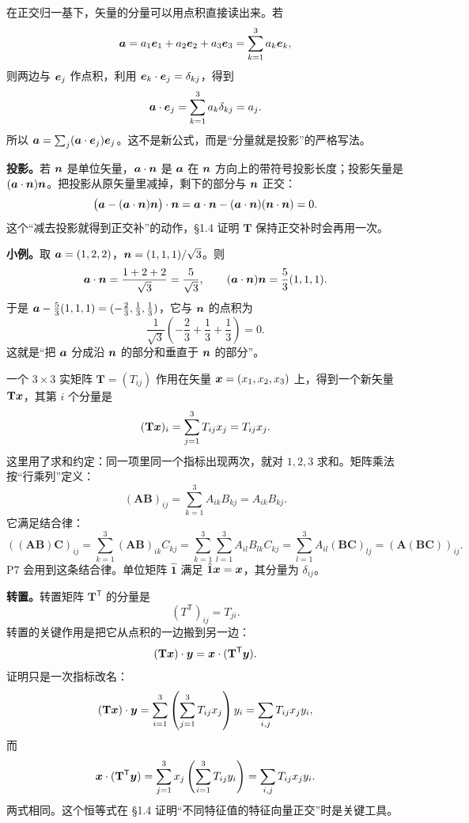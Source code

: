 \documentclass[11pt]{ctexart}
\newcommand{\ten}[1]{\mathbf{#1}}
\newcommand{\unitd}{\hat{\ten{1}}}
\let\origsubhdr\subhdr
\renewcommand{\subhdr}[1]{\par\needspace{3\baselineskip}\origsubhdr{#1}}
\begin{document}
在正交归一基下，矢量的分量可以用点积直接读出来。若
\[
\boldsymbol{a}=a_1\boldsymbol{e}_1+a_2\boldsymbol{e}_2+a_3\boldsymbol{e}_3=\sum_{k=1}^{3}a_k\boldsymbol{e}_k,
\]
则两边与 $\boldsymbol{e}_j$ 作点积，利用 $\boldsymbol{e}_k\cdot\boldsymbol{e}_j=\delta_{kj}$，得到
\[
\boldsymbol{a}\cdot\boldsymbol{e}_j=\sum_{k=1}^{3}a_k\delta_{kj}=a_j .
\]
所以 $\boldsymbol{a}=\sum_j(\boldsymbol{a}\cdot\boldsymbol{e}_j)\boldsymbol{e}_j$。这不是新公式，而是“分量就是投影”的严格写法。

\textbf{投影。}若 $\boldsymbol{n}$ 是单位矢量，$\boldsymbol{a}\cdot\boldsymbol{n}$ 是 $\boldsymbol{a}$ 在 $\boldsymbol{n}$ 方向上的带符号投影长度；投影矢量是 $(\boldsymbol{a}\cdot\boldsymbol{n})\boldsymbol{n}$。把投影从原矢量里减掉，剩下的部分与 $\boldsymbol{n}$ 正交：
\[
\bigl(\boldsymbol{a}-(\boldsymbol{a}\cdot\boldsymbol{n})\boldsymbol{n}\bigr)\cdot\boldsymbol{n}
=\boldsymbol{a}\cdot\boldsymbol{n}-(\boldsymbol{a}\cdot\boldsymbol{n})(\boldsymbol{n}\cdot\boldsymbol{n})=0 .
\]
这个“减去投影就得到正交补”的动作，§1.4 证明 $\ten T$ 保持正交补时会再用一次。

\textbf{小例。}取 $\boldsymbol{a}=(1,2,2)$，$\boldsymbol{n}=(1,1,1)/\sqrt3$。则
\[
\boldsymbol{a}\cdot\boldsymbol{n}=\frac{1+2+2}{\sqrt3}=\frac{5}{\sqrt3},
\qquad
(\boldsymbol{a}\cdot\boldsymbol{n})\boldsymbol{n}=\frac53(1,1,1).
\]
于是 $\boldsymbol{a}-\frac53(1,1,1)=(-\frac23,\frac13,\frac13)$，它与 $\boldsymbol{n}$ 的点积为
\[
\frac{1}{\sqrt3}\left(-\frac23+\frac13+\frac13\right)=0 .
\]
这就是“把 $\boldsymbol{a}$ 分成沿 $\boldsymbol{n}$ 的部分和垂直于 $\boldsymbol{n}$ 的部分”。


一个 $3\times3$ 实矩阵 $\ten T=(T_{ij})$ 作用在矢量 $\boldsymbol{x}=(x_1,x_2,x_3)$ 上，得到一个新矢量 $\ten T\vect x$，其第 $i$ 个分量是
\[
(\ten T\vect x)_i=\sum_{j=1}^{3}T_{ij}x_j=T_{ij}x_j .
\]
这里用了求和约定：同一项里同一个指标出现两次，就对 $1,2,3$ 求和。矩阵乘法按“行乘列”定义：
\[
(\ten A\ten B)_{ij}=\sum_{k=1}^{3}A_{ik}B_{kj}=A_{ik}B_{kj}.
\]
它满足结合律：
\[
((\ten A\ten B)\ten C)_{ij}
=\sum_{k=1}^{3}(\ten A\ten B)_{ik}C_{kj}
=\sum_{k=1}^{3}\sum_{l=1}^{3}A_{il}B_{lk}C_{kj}
=\sum_{l=1}^{3}A_{il}(\ten B\ten C)_{lj}
=(\ten A(\ten B\ten C))_{ij}.
\]
P7 会用到这条结合律。单位矩阵 $\unitd$ 满足 $\unitd\vect x=\vect x$，其分量为 $\delta_{ij}$。

\textbf{转置。}转置矩阵 $\ten T^{\mathsf T}$ 的分量是
\[
(T^{\mathsf T})_{ij}=T_{ji}.
\]
转置的关键作用是把它从点积的一边搬到另一边：
\[
(\ten T\vect x)\cdot\vect y=\vect x\cdot(\ten T^{\mathsf T}\vect y).
\]
证明只是一次指标改名：
\[
(\ten T\vect x)\cdot\vect y
=\sum_{i=1}^{3}\left(\sum_{j=1}^{3}T_{ij}x_j\right)y_i
=\sum_{i,j}T_{ij}x_jy_i,
\]
而
\[
\vect x\cdot(\ten T^{\mathsf T}\vect y)
=\sum_{j=1}^{3}x_j\left(\sum_{i=1}^{3}T_{ij}y_i\right)
=\sum_{i,j}T_{ij}x_jy_i .
\]
两式相同。这个恒等式在 §1.4 证明“不同特征值的特征向量正交”时是关键工具。
\end{document}

